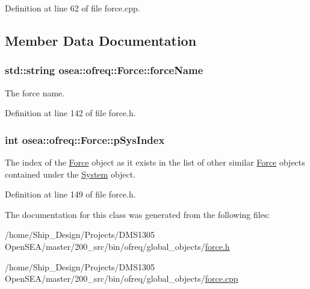 Definition at line 62 of file force.\-cpp.



\subsection{Member Data Documentation}
\hypertarget{classosea_1_1ofreq_1_1_force_af7cab6c2ebbe013f407570136a5cb8e7}{
\subsubsection[{force\-Name}]{\setlength{\rightskip}{0pt plus 5cm}std\-::string osea\-::ofreq\-::\-Force\-::force\-Name\hspace{0.3cm}{\ttfamily [protected]}}}\label{classosea_1_1ofreq_1_1_force_af7cab6c2ebbe013f407570136a5cb8e7}
The force name. 

Definition at line 142 of file force.\-h.

\hypertarget{classosea_1_1ofreq_1_1_force_ae93d98d3c25ed841450d2a839b936aad}{
\subsubsection[{p\-Sys\-Index}]{\setlength{\rightskip}{0pt plus 5cm}int osea\-::ofreq\-::\-Force\-::p\-Sys\-Index\hspace{0.3cm}{\ttfamily [protected]}}}\label{classosea_1_1ofreq_1_1_force_ae93d98d3c25ed841450d2a839b936aad}


The index of the \hyperlink{classosea_1_1ofreq_1_1_force}{Force} object as it exists in the list of other similar \hyperlink{classosea_1_1ofreq_1_1_force}{Force} objects contained under the \hyperlink{classosea_1_1ofreq_1_1_system}{System} object. 



Definition at line 149 of file force.\-h.



The documentation for this class was generated from the following files\-:\begin{DoxyCompactItemize}
\item 
/home/\-Ship\-\_\-\-Design/\-Projects/\-D\-M\-S1305 Open\-S\-E\-A/master/200\-\_\-src/bin/ofreq/global\-\_\-objects/\hyperlink{force_8h}{force.\-h}\item 
/home/\-Ship\-\_\-\-Design/\-Projects/\-D\-M\-S1305 Open\-S\-E\-A/master/200\-\_\-src/bin/ofreq/global\-\_\-objects/\hyperlink{force_8cpp}{force.\-cpp}\end{DoxyCompactItemize}
